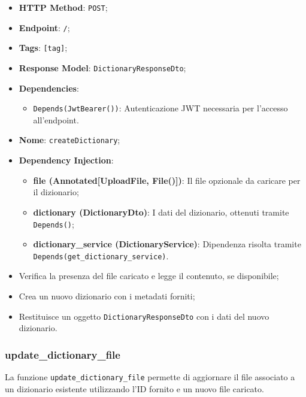 \begin{itemize}
\item \textbf{HTTP Method}: \texttt{POST};
\item \textbf{Endpoint}: \texttt{/};
\item \textbf{Tags}: \texttt{[tag]};
\item \textbf{Response Model}: \texttt{DictionaryResponseDto};
\item \textbf{Dependencies}:
\begin{itemize}
\item \texttt{Depends(JwtBearer())}: Autenticazione JWT necessaria per l'accesso all'endpoint.
\end{itemize}
\item \textbf{Nome}: \texttt{createDictionary};
\item \textbf{Dependency Injection}:
\begin{itemize}
\item \textbf{file (Annotated[UploadFile, File()])}: Il file opzionale da caricare per il dizionario;
\item \textbf{dictionary (DictionaryDto)}: I dati del dizionario, ottenuti tramite \texttt{Depends()};
\item \textbf{dictionary\_service (DictionaryService)}: Dipendenza risolta tramite \texttt{Depends(get\_dictionary\_service)}.
\end{itemize}
\end{itemize}

\begin{itemize}
\item Verifica la presenza del file caricato e legge il contenuto, se disponibile;
\item Crea un nuovo dizionario con i metadati forniti;
\item Restituisce un oggetto \texttt{DictionaryResponseDto} con i dati del nuovo dizionario.
\end{itemize}

\subsubsection{update\_dictionary\_file}

\par La funzione \texttt{update\_dictionary\_file} permette di aggiornare il file associato a un dizionario esistente utilizzando l'ID fornito e un nuovo file caricato.

